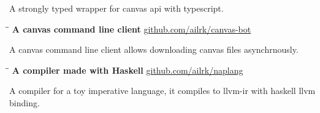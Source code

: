 \documentclass{res}
\begin{document}
\begin{resume}
\begin{tabbing}
    \end{tabbing}\vspace{-30pt}
    A strongly typed wrapper for canvas api with typescript.

    \vspace{-0.2in}
    \begin{tabbing}
        \hspace{2.4in}\= \hspace{0.9in}\= \kill
        {\bf A canvas command line client} \>               \>\url{github.com/ailrk/canvas-bot}\\

    \end{tabbing}\vspace{-30pt}
    A canvas command line client allows downloading canvas files asynchrnously.

    \vspace{-0.2in}
    \begin{tabbing}
        \hspace{2.4in}\= \hspace{0.9in}\= \kill
        {\bf A compiler made with Haskell} \>               \>\url{github.com/ailrk/naplang}\\

    \end{tabbing}\vspace{-30pt}
    A compiler for a toy imperative language, it compiles to llvm-ir with haskell llvm binding.



\end{resume}
\end{document}
